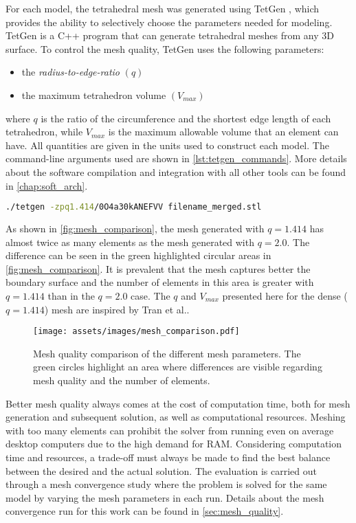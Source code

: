 For each model, the tetrahedral mesh was generated using TetGen \cite{tetgen}, which provides the ability to selectively choose the parameters needed for modeling. TetGen \cite{tetgen} is a C++ program that can generate tetrahedral meshes from any 3D surface. To control the mesh quality, TetGen \cite{tetgen} uses the following parameters:
\begin{itemize}
	\item the \textit{radius-to-edge-ratio} $(q)$
	\item the maximum tetrahedron volume $(V_{max})$
\end{itemize}
where $q$ is the ratio of the circumference and the shortest edge length of each tetrahedron, while $V_{max}$ is the maximum allowable volume that an element can have. All quantities are given in the units used to construct each model. The command-line arguments used are shown in \autoref{lst:tetgen_commands}. More details about the software compilation and integration with all other tools can be found in \autoref{chap:soft_arch}.

\begin{lstlisting}[language=bash,caption={Command to run TetGen},captionpos=b, label=lst:tetgen_commands]
	./tetgen -zpq1.414/0O4a30kANEFVV filename_merged.stl
\end{lstlisting}

As shown in \autoref{fig:mesh_comparison}, the mesh generated with $q = 1.414$ has almost twice as many elements as the mesh generated with $q = 2.0$. The difference can be seen in the green highlighted circular areas in \autoref{fig:mesh_comparison}. It is prevalent that the mesh captures better the boundary surface and the number of elements in this area is greater with $q = 1.414$ than in the $q = 2.0$ case. The $q$ and $V_{max}$ presented here for the dense ($q=1.414$) mesh are inspired by Tran et al.\cite{Tran2020}.

\begin{figure}[H]
    \centering
    \texttt{[image: assets/images/mesh\_comparison.pdf]}
    \caption[Mesh quality comparison for the different $q$ parameters.]{Mesh quality comparison of the different mesh parameters. The green circles highlight an area where differences are visible regarding mesh quality and the number of elements.}
    \label{fig:mesh_comparison}
\end{figure}

Better mesh quality always comes at the cost of computation time, both for mesh generation and subsequent solution, as well as computational resources. Meshing with too many elements can prohibit the solver from running even on average desktop computers due to the high demand for \gls{RAM}. Considering computation time and resources, a trade-off must always be made to find the best balance between the desired and the actual solution. The evaluation is carried out through a mesh convergence study where the problem is solved for the same model by varying the mesh parameters in each run. Details about the mesh convergence run for this work can be found in \ref{sec:mesh_quality}.

